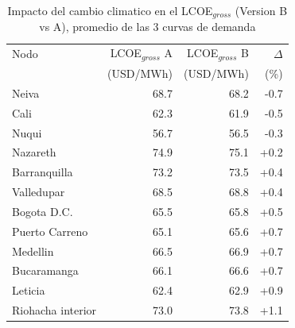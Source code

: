 \begin{table}[htbp]
\centering
\caption{Impacto del cambio climatico en el LCOE$_{gross}$ (Version B vs A), promedio de las 3 curvas de demanda}
\label{tab:climate}
\small
\begin{tabular}{lrrr}
\toprule
Nodo & LCOE$_{gross}$ A & LCOE$_{gross}$ B & $\Delta$ \\
 & (USD/MWh) & (USD/MWh) & (\%) \\ \midrule
Neiva & 68.7 & 68.2 & -0.7 \\
Cali & 62.3 & 61.9 & -0.5 \\
Nuqui & 56.7 & 56.5 & -0.3 \\
Nazareth & 74.9 & 75.1 & +0.2 \\
Barranquilla & 73.2 & 73.5 & +0.4 \\
Valledupar & 68.5 & 68.8 & +0.4 \\
Bogota D.C. & 65.5 & 65.8 & +0.5 \\
Puerto Carreno & 65.1 & 65.6 & +0.7 \\
Medellin & 66.5 & 66.9 & +0.7 \\
Bucaramanga & 66.1 & 66.6 & +0.7 \\
Leticia & 62.4 & 62.9 & +0.9 \\
Riohacha interior & 73.0 & 73.8 & +1.1 \\
\bottomrule
\end{tabular}
\end{table}